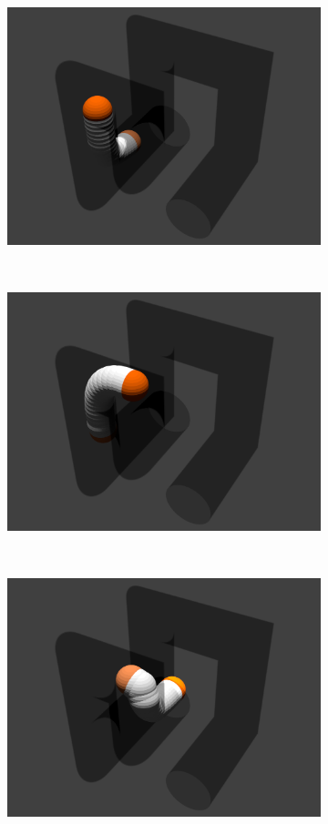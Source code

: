 \documentclass[12pt,a4]{article}
\begin{document}
\begin{figure}[ht!]
\begin{subfigure}{0.31\textwidth}
    \end{subfigure}%
    \\
    
       \begin{subfigure}{0.31\textwidth}
        \centering
        \includegraphics[width=0.8\linewidth]{figures/Pipesnaps/4.png}
       
    \end{subfigure}%
    ~
        \begin{subfigure}{0.31\textwidth}
        \centering
        \includegraphics[width=0.8\linewidth]{figures/Pipesnaps/5.png}
      
    \end{subfigure}%
    ~
        \begin{subfigure}{0.31\textwidth}
        \centering
        \includegraphics[width=0.8\linewidth]{figures/Pipesnaps/6.png}
        

\end{subfigure}
\end{figure}
\end{document}

